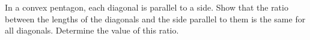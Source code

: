 In a convex pentagon, each diagonal is parallel to a side.
Show that the ratio between the lengths of the diagonals and the side parallel
to them is the same for all diagonals. Determine the value of this ratio.
